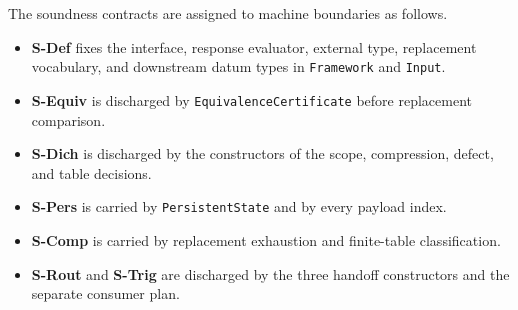 The soundness contracts are assigned to machine boundaries as follows.
\begin{itemize}
\tightlist
\item \textbf{S-Def} fixes the interface, response evaluator, external type, replacement vocabulary, and downstream datum types in \texttt{Framework} and \texttt{Input}.
\item \textbf{S-Equiv} is discharged by \texttt{EquivalenceCertificate} before replacement comparison.
\item \textbf{S-Dich} is discharged by the constructors of the scope, compression, defect, and table decisions.
\item \textbf{S-Pers} is carried by \texttt{PersistentState} and by every payload index.
\item \textbf{S-Comp} is carried by replacement exhaustion and finite-table classification.
\item \textbf{S-Rout} and \textbf{S-Trig} are discharged by the three handoff constructors and the separate consumer plan.
\end{itemize}

